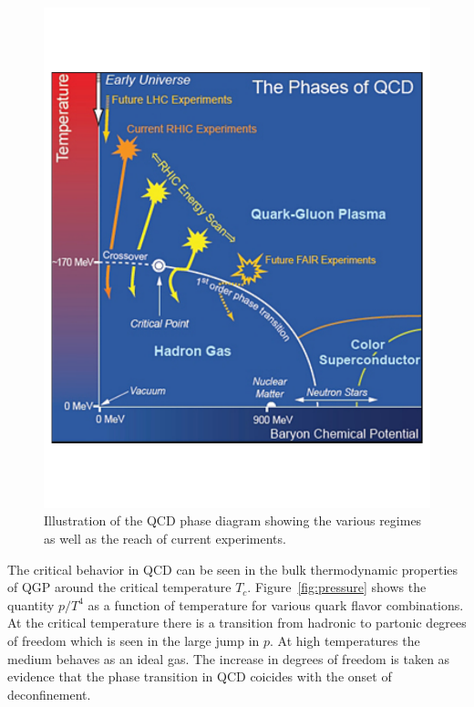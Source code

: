 \begin{figure}[htbp]
\begin{center}
\includegraphics[scale=0.5]{Plots/Intro/qcd_phase.pdf}
\end{center}
\caption[QCD Phase Diagram]{Illustration of the QCD phase diagram showing the various regimes as well as the reach of current experiments.}
\label{fig:qcd_phase}
\end{figure}

The critical behavior in QCD can be seen in the bulk thermodynamic properties of QGP around the critical temperature $T_c$. Figure~\ref{fig:pressure} shows the quantity $p/T^4$ as a function of temperature for various quark flavor combinations. At the critical temperature there is a transition from hadronic to partonic degrees of freedom which is seen in the large jump in $p$. At high temperatures the medium behaves as an ideal gas. The increase in degrees of freedom is taken as evidence that the phase transition in QCD coicides with the onset of deconfinement.

